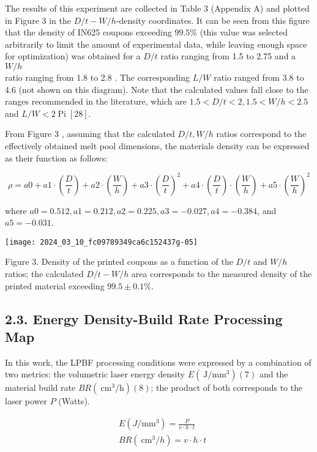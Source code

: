 \documentclass[10pt]{article}
\begin{document}
The results of this experiment are collected in Table 3 (Appendix A) and plotted in Figure 3 in the $D / t-W / h$-density coordinates. It can be seen from this figure that the density of IN625 coupons exceeding $99.5 \%$ (this value was selected arbitrarily to limit the amount of experimental data, while leaving enough space for optimization) was obtained for a $D / t$ ratio ranging from 1.5 to 2.75 and a $W / h$\\
ratio ranging from 1.8 to 2.8 . The corresponding $L / W$ ratio ranged from 3.8 to 4.6 (not shown on this diagram). Note that the calculated values fall close to the ranges recommended in the literature, which are $1.5<D / t<2,1.5<W / h<2.5$ and $L / W<2 \operatorname{Pi}[28]$.

From Figure 3 , assuming that the calculated $D / t, W / h$ ratios correspond to the effectively obtained melt pool dimensions, the materials density can be expressed as their function as follows:


\begin{equation*}
\rho=a 0+a 1 \cdot\left(\frac{D}{t}\right)+a 2 \cdot\left(\frac{W}{h}\right)+a 3 \cdot\left(\frac{D}{t}\right)^{2}+a 4 \cdot\left(\frac{D}{t}\right) \cdot\left(\frac{W}{h}\right)+a 5 \cdot\left(\frac{W}{h}\right)^{2} \tag{6}
\end{equation*}


where $a 0=0.512, a 1=0.212, a 2=0.225, a 3=-0.027, a 4=-0.384$, and $a 5=-0.031$.

\begin{center}
\texttt{[image: 2024\_03\_10\_fc09789349ca6c152437g-05]}
\end{center}

Figure 3. Density of the printed coupons as a function of the $D / t$ and $W / h$ ratios; the calculated $D / t-W / h$ area corresponds to the measured density of the printed material exceeding $99.5 \pm 0.1 \%$.

\subsection*{2.3. Energy Density-Build Rate Processing Map}
In this work, the LPBF processing conditions were expressed by a combination of two metrics: the volumetric laser energy density $E\left(\mathrm{~J} / \mathrm{mm}^{3}\right)(7)$ and the material build rate $B R\left(\mathrm{~cm}^{3} / \mathrm{h}\right)(8)$; the product of both corresponds to the laser power $P$ (Watts).


\begin{align*}
& E\left(J / \mathrm{mm}^{3}\right)=\frac{P}{v \cdot h \cdot t}  \tag{7}\\
& B R\left(\mathrm{~cm}^{3} / h\right)=v \cdot h \cdot t \tag{8}
\end{align*}
\end{document}
